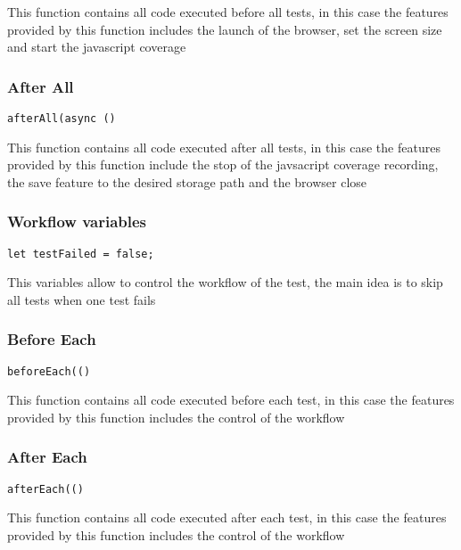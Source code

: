 \documentclass[a4paper]{article}
\begin{document}
This function contains all code executed before all tests, in this case the
features provided by this function includes the launch of the browser, set
the screen size and start the javascript coverage

\hypertarget{toc22}{}
\subsubsection{After All}

\begin{lstlisting}
afterAll(async ()
\end{lstlisting}

This function contains all code executed after all tests, in this case the
features provided by this function include the stop of the javsacript coverage
recording, the save feature to the desired storage path and the browser close

\hypertarget{toc23}{}
\subsubsection{Workflow variables}

\begin{lstlisting}
let testFailed = false;
\end{lstlisting}

This variables allow to control the workflow of the test, the main idea is to
skip all tests when one test fails

\hypertarget{toc24}{}
\subsubsection{Before Each}

\begin{lstlisting}
beforeEach(()
\end{lstlisting}

This function contains all code executed before each test, in this case the
features provided by this function includes the control of the workflow

\hypertarget{toc25}{}
\subsubsection{After Each}

\begin{lstlisting}
afterEach(()
\end{lstlisting}

This function contains all code executed after each test, in this case the
features provided by this function includes the control of the workflow
\end{document}
